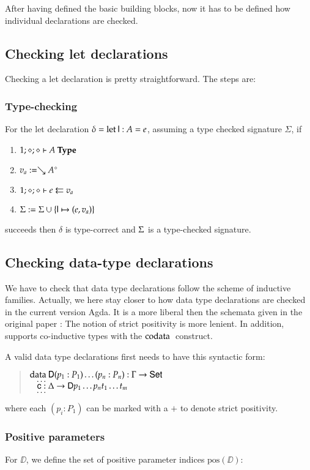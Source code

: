 After having defined the basic building blocks, now it has to be defined how individual declarations are checked.

\subsection{Checking let declarations}
Checking a let declaration is pretty straightforward.
The steps are:
\subsubsection{Type-checking} 

For the let declaration $ \delta = \clet \dd : A = e $, assuming a type checked signature $\Sigma$, if
\begin{enumerate}
\item
$\IsType{1}{\diamond}{\diamond}{A}$
\item
$ v_a := \wh \cl{A}{\diamond}$
\item
$\Check{1}{\diamond}{\diamond}{e}{v_a}$
\item
$\Sig := \Sig \cup \{\dd \mapsto (e,v_a)\}$
\end{enumerate}
succeeds then $\delta$ is type-correct and $\Sig$ is a type-checked signature.

\subsection{Checking data-type declarations}
We have to check that data type declarations follow the scheme of inductive families.
Actually, we here stay closer to how data type declarations are checked in the current version Agda.
It is a more liberal then the schemata given in the original paper \cite{dybjer94inductive}: The notion of strict positivity is more lenient. In addition, \mugda supports co-inductive types with the $\codata$ construct.

\noindent A valid data type declarations first needs to have this syntactic form:
\begin{quote}
$\data \DD ( p_1 : P_1) \ldots ( p_n : P_n) : \Gamma \ra \Set $\\
$\spc \ldots$\\
$\spc \cc : \Delta \ra \DD p_1 \ldots p_n t_1 \ldots t_m$\\
$\spc \ldots$\\   
\end{quote}
\newcommand{\pos}{\mbox{pos}}
where each $(p_i : P_1) $ can be marked with a $+$ to denote strict positivity.
\subsubsection{Positive parameters}
For $\DD$, we define the set of positive parameter indices $\pos(\DD)$:

